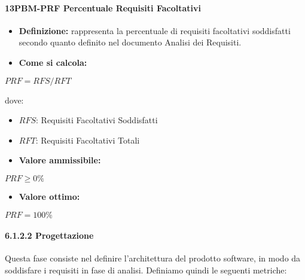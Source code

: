\paragraph*{13PBM-PRF Percentuale Requisiti Facoltativi}
\begin{itemize}
    \item \textbf{Definizione:} rappresenta la percentuale di requisiti facoltativi soddisfatti secondo quanto definito nel documento Analisi dei Requisiti.
    \item \textbf{Come si calcola:}
\end{itemize}
\begin{center}
   $PRF = RFS/RFT$ 
\end{center}
dove:
\begin{itemize}[label=$\rightarrow$]
    \item $RFS$: Requisiti Facoltativi Soddisfatti
    \item $RFT$: Requisiti Facoltativi Totali
\end{itemize}
\begin{itemize}
    \item \textbf{Valore ammissibile:}
\end{itemize}
\begin{center}
    $PRF \geq 0\%$
\end{center}
\begin{itemize}
    \item \textbf{Valore ottimo:}
\end{itemize}
\begin{center}
    $PRF = 100\%$
\end{center}

\paragraph*{6.1.2.2 Progettazione}
Questa fase consiste nel definire l'architettura  del prodotto software, in modo da soddisfare i requisiti in fase di analisi. Definiamo quindi le seguenti metriche:

